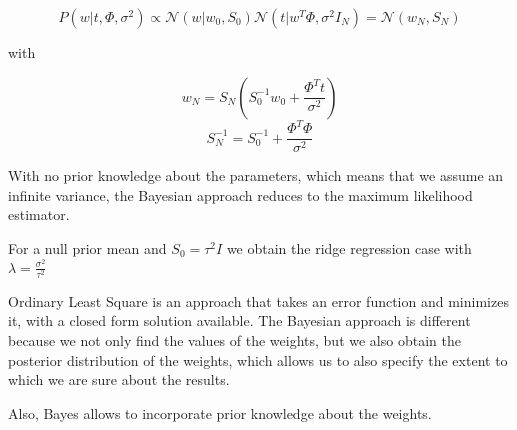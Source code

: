     

    $$
    P(w|t, \Phi, \sigma ^2) \propto \mathcal{N} (w|w_0, S_0) \mathcal{N} (t|w^T \Phi, \sigma ^2 I_N) = \mathcal{N} (w_N, S_N) 
    $$

    with 

    $$
    w_N = S_N(S_0^{-1} w_0 + \frac{\Phi ^T t}{\sigma ^2})
    $$
    $$
    S_N ^{-1} = S_0^{-1} + \frac{\Phi ^T \Phi}{\sigma ^2 }
    $$

    With no prior knowledge about the parameters, which means that we assume an infinite variance, the Bayesian approach reduces to the maximum likelihood estimator.

    For a null prior mean and $S_0 = \tau ^2 I$ we obtain the ridge regression case with $\lambda = \frac{\sigma ^2}{\tau ^2}$

    Ordinary Least Square is an approach that takes an error function and minimizes it, with a closed form solution available. The Bayesian approach is different because we not only find the values of the weights, but we also obtain the posterior distribution of the weights, which allows us to also specify the extent to which we are sure about the results.

    Also, Bayes allows to incorporate prior knowledge about the weights.

